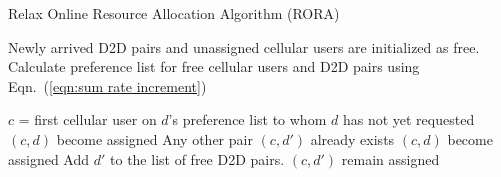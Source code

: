 \documentclass[times]{dacauth}
\begin{document}
\par
 \begin{algorithm}	
   \caption{Relax Online Resource Allocation Algorithm (RORA) }
   \label{algorthm2}
    \begin{algorithmic}[1]

       \State Newly arrived D2D pairs and unassigned cellular users are initialized as free.  
        \State Calculate preference list for free cellular users and D2D pairs using Eqn.~(\ref{eqn:sum rate increment})
			
		
			\State $c$ = first cellular user on $d$'s preference list to whom $d$ has not yet requested
				\State $(c,d)$ become assigned
			\Else
				\State Any other pair $(c, d')$ already exists
					\State $(c, d)$ become assigned
					\State Add $d'$ to the list of free D2D pairs.
				\Else
					\State $(c, d')$ remain assigned
				\EndIf
			\EndIf
		\EndWhile      	
	\EndProcedure

\end{algorithmic}
\end{algorithm}
\end{document}
